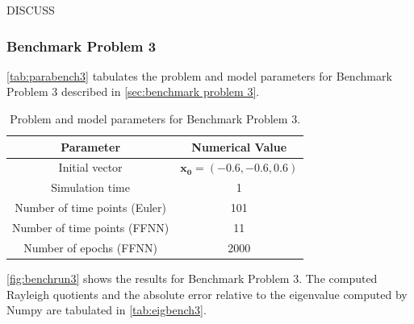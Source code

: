 DISCUSS


\subsubsection{Benchmark Problem 3}

\autoref{tab:parabench3} tabulates the problem and model parameters for Benchmark Problem 3 described in \autoref{sec:benchmark problem 3}. 

\begin{table}[H]
\caption{Problem and model parameters for Benchmark Problem 3.}
\centering
{}
\begin{tabular}{c|c}
\hline
\hline 
Parameter & Numerical Value
\\
\hline 
\hline 
Initial vector & $\bm{x_0}=(-0.6, -0.6,  0.6)$
\\
Simulation time & 1
\\
Number of time points (Euler) & 101
\\
Number of time points (FFNN) & 11
\\
Number of epochs (FFNN) & 2000
\\
\hline
\hline 
\end{tabular}
\label{tab:parabench3}
\end{table}


\autoref{fig:benchrun3} shows the results for Benchmark Problem 3. The computed Rayleigh quotients and the absolute error relative to the eigenvalue computed by Numpy are tabulated in \autoref{tab:eigbench3}. 

